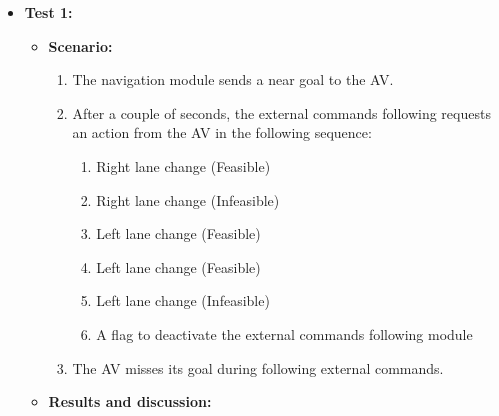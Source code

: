 \begin{itemize}
    \item \textbf{Test 1:}
    \begin{itemize}
    \item \textbf{Scenario:} 
    \begin{enumerate}
        \item \label{Scenario: hlcmt11} The navigation module sends a near goal to the AV.
        \item \label{Scenario: hlcmt12} After a couple of seconds, the external commands following requests an action from the AV in the following sequence:
        \begin{enumerate}
            \item Right lane change (Feasible)
            \item Right lane change (Infeasible)
            \item Left lane change (Feasible)
            \item Left lane change (Feasible)
            \item Left lane change (Infeasible)
            \item A flag to deactivate the external commands following module 
        \end{enumerate}
        \item \label{Scenario: hlcmt13} The AV misses its goal during following external commands.
    \end{enumerate}
    
    \item \textbf{Results and discussion:} 
    

\end{itemize}
\end{itemize}
